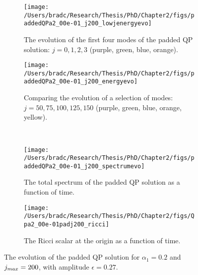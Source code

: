 \documentclass[../PhD.tex]{subfiles}
\begin{document}
\begin{figure}[H]
	\centering
	\begin{subfigure}[t]{0.45\textwidth}
		\texttt{[image: /Users/bradc/Research/Thesis/PhD/Chapter2/figs/paddedQPa2\_00e-01\_j200\_lowjenergyevo]}
		\caption{The evolution of the first four modes of the padded QP solution: {$j=0,1,2,3$} (purple, green, blue, orange).}
	\end{subfigure}
	\hfill
	\begin{subfigure}[t]{0.45\textwidth}
		\texttt{[image: /Users/bradc/Research/Thesis/PhD/Chapter2/figs/paddedQPa2\_00e-01\_j200\_energyevo]}
		\caption{Comparing the evolution of a selection of modes: {$j= 50, 75, 100, 125, 150$} (purple, green, blue, orange, yellow).}
	\end{subfigure}
	\\
	\begin{subfigure}[t]{0.45\textwidth}
		\texttt{[image: /Users/bradc/Research/Thesis/PhD/Chapter2/figs/paddedQPa2\_00e-01\_j200\_spectrumevo]}
		\caption{The total spectrum of the padded QP solution as a function of time.}
		\label{fig: paddedqp_fullspecevo}
	\end{subfigure}
	\:\:\:
	\begin{subfigure}[t]{0.45\textwidth}
		\texttt{[image: /Users/bradc/Research/Thesis/PhD/Chapter2/figs/Qpa2\_00e-01padj200\_ricci]}
		\caption{The Ricci scalar at the origin as a function of time.}
		\label{fig: Qpa2_00e-01padj200_ricci}
	\end{subfigure}
	\caption[The evolution of a padded QP solution]{The evolution of the padded QP solution for $\alpha_1 =0.2$ and $j_{max} = 200$, with amplitude $\epsilon=0.27$.}
	\label{fig:paddedqpevo}
\end{figure}

\end{document}
